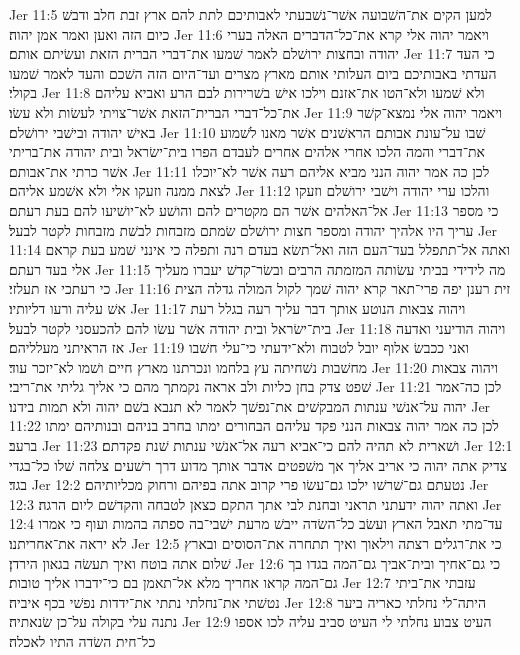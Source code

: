 Jer 11:5  למען הקים את־השׁבועה אשׁר־נשׁבעתי לאבותיכם לתת להם ארץ זבת חלב ודבשׁ כיום הזה ואען ואמר אמן יהוה׃
Jer 11:6  ויאמר יהוה אלי קרא את־כל־הדברים האלה בערי יהודה ובחצות ירושׁלם לאמר שׁמעו את־דברי הברית הזאת ועשׂיתם אותם׃
Jer 11:7  כי העד העדתי באבותיכם ביום העלותי אותם מארץ מצרים ועד־היום הזה השׁכם והעד לאמר שׁמעו בקולי׃
Jer 11:8  ולא שׁמעו ולא־הטו את־אזנם וילכו אישׁ בשׁרירות לבם הרע ואביא עליהם את־כל־דברי הברית־הזאת אשׁר־צויתי לעשׂות ולא עשׂו׃
Jer 11:9  ויאמר יהוה אלי נמצא־קשׁר באישׁ יהודה ובישׁבי ירושׁלם׃
Jer 11:10  שׁבו על־עונת אבותם הראשׁנים אשׁר מאנו לשׁמוע את־דברי והמה הלכו אחרי אלהים אחרים לעבדם הפרו בית־ישׂראל ובית יהודה את־בריתי אשׁר כרתי את־אבותם׃
Jer 11:11  לכן כה אמר יהוה הנני מביא אליהם רעה אשׁר לא־יוכלו לצאת ממנה וזעקו אלי ולא אשׁמע אליהם׃
Jer 11:12  והלכו ערי יהודה וישׁבי ירושׁלם וזעקו אל־האלהים אשׁר הם מקטרים להם והושׁע לא־יושׁיעו להם בעת רעתם׃
Jer 11:13  כי מספר עריך היו אלהיך יהודה ומספר חצות ירושׁלם שׂמתם מזבחות לבשׁת מזבחות לקטר לבעל׃
Jer 11:14  ואתה אל־תתפלל בעד־העם הזה ואל־תשׂא בעדם רנה ותפלה כי אינני שׁמע בעת קראם אלי בעד רעתם׃
Jer 11:15  מה לידידי בביתי עשׂותה המזמתה הרבים ובשׂר־קדשׁ יעברו מעליך כי רעתכי אז תעלזי׃
Jer 11:16  זית רענן יפה פרי־תאר קרא יהוה שׁמך לקול המולה גדלה הצית אשׁ עליה ורעו דליותיו׃
Jer 11:17  ויהוה צבאות הנוטע אותך דבר עליך רעה בגלל רעת בית־ישׂראל ובית יהודה אשׁר עשׂו להם להכעסני לקטר לבעל׃
Jer 11:18  ויהוה הודיעני ואדעה אז הראיתני מעלליהם׃
Jer 11:19  ואני ככבשׂ אלוף יובל לטבוח ולא־ידעתי כי־עלי חשׁבו מחשׁבות נשׁחיתה עץ בלחמו ונכרתנו מארץ חיים ושׁמו לא־יזכר עוד׃
Jer 11:20  ויהוה צבאות שׁפט צדק בחן כליות ולב אראה נקמתך מהם כי אליך גליתי את־ריבי׃
Jer 11:21  לכן כה־אמר יהוה על־אנשׁי ענתות המבקשׁים את־נפשׁך לאמר לא תנבא בשׁם יהוה ולא תמות בידנו׃
Jer 11:22  לכן כה אמר יהוה צבאות הנני פקד עליהם הבחורים ימתו בחרב בניהם ובנותיהם ימתו ברעב׃
Jer 11:23  ושׁארית לא תהיה להם כי־אביא רעה אל־אנשׁי ענתות שׁנת פקדתם׃
Jer 12:1  צדיק אתה יהוה כי אריב אליך אך משׁפטים אדבר אותך מדוע דרך רשׁעים צלחה שׁלו כל־בגדי בגד׃
Jer 12:2  נטעתם גם־שׁרשׁו ילכו גם־עשׂו פרי קרוב אתה בפיהם ורחוק מכליותיהם׃
Jer 12:3  ואתה יהוה ידעתני תראני ובחנת לבי אתך התקם כצאן לטבחה והקדשׁם ליום הרגה׃
Jer 12:4  עד־מתי תאבל הארץ ועשׂב כל־השׂדה ייבשׁ מרעת ישׁבי־בה ספתה בהמות ועוף כי אמרו לא יראה את־אחריתנו׃
Jer 12:5  כי את־רגלים רצתה וילאוך ואיך תתחרה את־הסוסים ובארץ שׁלום אתה בוטח ואיך תעשׂה בגאון הירדן׃
Jer 12:6  כי גם־אחיך ובית־אביך גם־המה בגדו בך גם־המה קראו אחריך מלא אל־תאמן בם כי־ידברו אליך טובות׃
Jer 12:7  עזבתי את־ביתי נטשׁתי את־נחלתי נתתי את־ידדות נפשׁי בכף איביה׃
Jer 12:8  היתה־לי נחלתי כאריה ביער נתנה עלי בקולה על־כן שׂנאתיה׃
Jer 12:9  העיט צבוע נחלתי לי העיט סביב עליה לכו אספו כל־חית השׂדה התיו לאכלה׃

